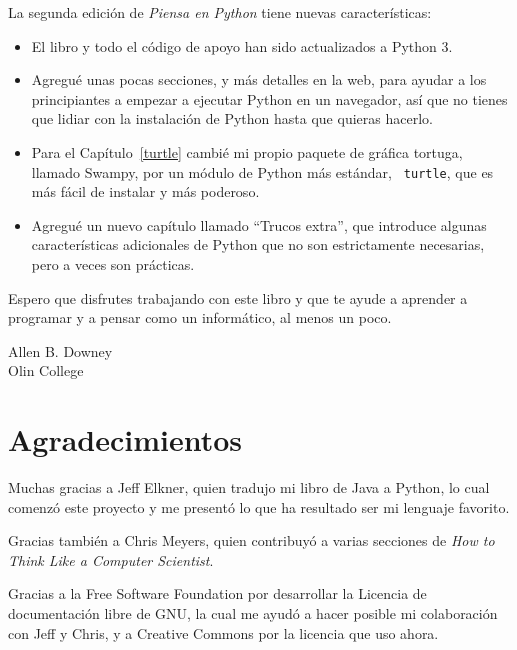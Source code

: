 \documentclass[10pt]{book}
\begin{document}
La segunda edición de {\em Piensa en Python} tiene nuevas características:

\begin{itemize}

\item El libro y todo el código de apoyo han sido actualizados a Python 3.

\item Agregué unas pocas secciones, y más detalles en la web, para ayudar a
los principiantes a empezar a ejecutar Python en un navegador, así que no
tienes que lidiar con la instalación de Python hasta que quieras hacerlo.

\item Para el Capítulo~\ref{turtle} cambié mi propio paquete de gráfica
  tortuga, llamado Swampy, por un módulo de Python más estándar, {\tt
    turtle}, que es más fácil de instalar y más poderoso.

\item Agregué un nuevo capítulo llamado ``Trucos extra'', que introduce
algunas características adicionales de Python que no son estrictamente
necesarias, pero a veces son prácticas.

\end{itemize}

Espero que disfrutes trabajando con este libro y que te ayude a aprender
a programar y a pensar como un informático, al menos un poco.


Allen B. Downey \\

Olin College \\


\section*{Agradecimientos}

Muchas gracias a Jeff Elkner, quien
tradujo mi libro de Java a Python, lo cual comenzó este
proyecto y me presentó lo que ha resultado ser mi
lenguaje favorito.

Gracias también a Chris Meyers, quien contribuyó a varias secciones
de {\em How to Think Like a Computer Scientist}.

Gracias a la Free Software Foundation por desarrollar
la Licencia de documentación libre de GNU, la cual me ayudó
a hacer posible mi colaboración con Jeff y Chris, y a Creative
Commons por la licencia que uso ahora.
\end{document}
